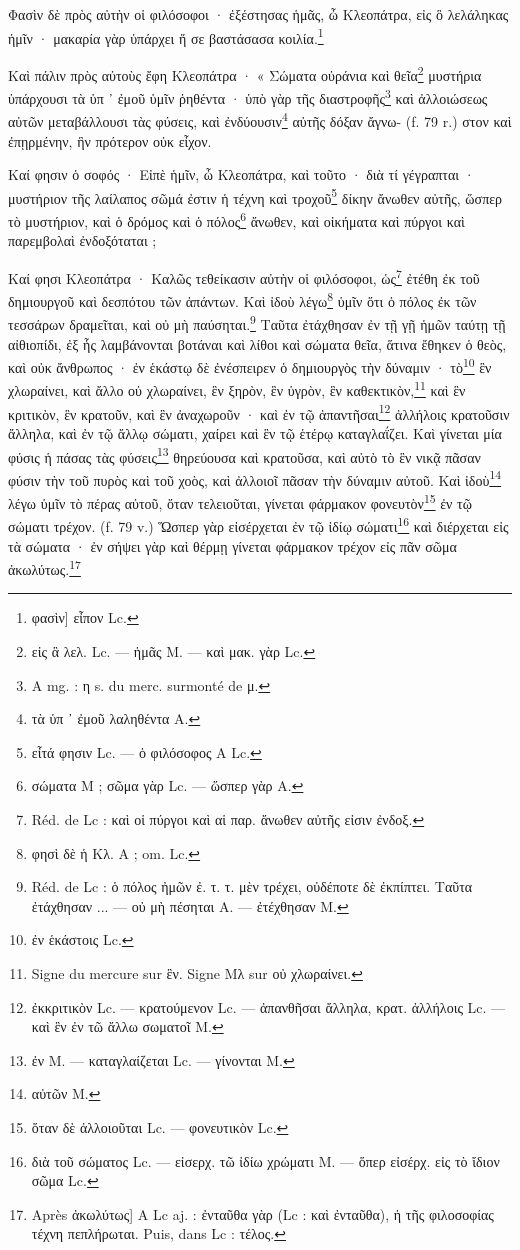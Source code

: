 \documentclass[a4paper, 11pt, oneside, polutonikogreek, french]{article}
\begin{document}
Φασὶν δὲ πρὸς αὐτὴν οἱ φιλόσοφοι · ἐξέστησας ἡμᾶς, ὦ Κλεοπάτρα, εἰς ὃ λελάληκας ἡμῖν · μακαρία γὰρ ὑπάρχει ἥ σε βαστάσασα κοιλία.\footnote{φασὶν] εἶπον Lc.}

Καὶ πάλιν πρὸς αὐτοὺς ἔφη Κλεοπάτρα · « Σώματα οὐράνια καὶ θεῖα\footnote{εἰς ἃ λελ. Lc. --- ἡμᾶς M. --- καὶ μακ. γὰρ Lc.} μυστήρια ὑπάρχουσι τὰ ὑπ ᾽ ἐμοῦ ὑμῖν ῥηθέντα · ὑπὸ γὰρ τῆς διαστροφῆς\footnote{A mg. : η s. du merc. surmonté de μ.} καὶ ἀλλοιώσεως αὐτῶν μεταβάλλουσι τὰς φύσεις, καὶ ἐνδύουσιν\footnote{τὰ ὑπ ᾽ ἐμοῦ λαληθέντα A.} αὐτῆς δόξαν ἄγνω- (f. 79 r.) στον καὶ ἐπῃρμένην, ἣν πρότερον οὐκ εἶχον.

Καί φησιν ὁ σοφός · Εἰπὲ ἡμῖν, ὦ Κλεοπάτρα, καὶ τοῦτο · διὰ τί γέγραπται · μυστήριον τῆς λαίλαπος σῶμά ἐστιν ἡ τέχνη καὶ τροχοῦ\footnote{εἶτά φησιν Lc. --- ὁ φιλόσοφος A Lc.} δίκην ἄνωθεν αὐτῆς, ὥσπερ τὸ μυστήριον, καὶ ὁ δρόμος καὶ ὁ πόλος\footnote{σώματα M ; σῶμα γὰρ Lc. --- ὥσπερ γὰρ A.} ἄνωθεν, καὶ οἰκήματα καὶ πύργοι καὶ παρεμβολαὶ ἐνδοξόταται ;

Καί φησι Κλεοπάτρα · Καλῶς τεθείκασιν αὐτὴν οἱ φιλόσοφοι, ὡς\footnote{Réd. de Lc : καὶ οἱ πύργοι καὶ αἱ παρ. ἄνωθεν αὐτῆς εἰσιν ἐνδοξ.} ἐτέθη ἐκ τοῦ δημιουργοῦ καὶ δεσπότου τῶν ἀπάντων. Καὶ ἰδοὺ λέγω\footnote{φησὶ δὲ ἡ Kλ. A ; om. Lc.} ὑμῖν ὅτι ὁ πόλος ἐκ τῶν τεσσάρων δραμεῖται, καὶ οὐ μὴ παύσηται.\footnote{Réd. de Lc : ὁ πόλος ἠμῶν ἐ. τ. τ. μὲν τρέχει, οὐδέποτε δὲ ἐκπίπτει. Ταῦτα ἐτάχθησαν ... --- οὐ μὴ πέσηται A. --- ἐτέχθησαν M.} Ταῦτα ἐτάχθησαν ἐν τῇ γῇ ἡμῶν ταύτῃ τῇ αἰθιοπίδι, ἐξ ἧς λαμβάνονται βοτάναι καὶ λίθοι καὶ σώματα θεῖα, ἅτινα ἔθηκεν ὁ θεὸς, καὶ οὐκ ἄνθρωπος · ἐν ἑκάστῳ δὲ ἐνέσπειρεν ὁ δημιουργὸς τὴν δύναμιν · τὸ\footnote{ἐν ἑκάστοις Lc.} ἓν χλωραίνει, καὶ ἄλλο οὐ χλωραίνει, ἓν ξηρὸν, ἓν ὑγρὸν, ἓν καθεκτικὸν,\footnote{Signe du mercure sur ἓν. Signe Mλ sur οὐ χλωραίνει.} καὶ ἓν κριτικὸν, ἓν κρατοῦν, καὶ ἓν ἀναχωροῦν · καὶ ἐν τῷ ἀπαντῆσαι\footnote{ἐκκριτικὸν Lc. --- κρατούμενον Lc. --- ἀπανθῆσαι ἄλληλα, κρατ. ἀλλήλοις Lc. --- καὶ ἓν ἐν τῶ ἄλλω σωματοῖ M.} ἀλλήλοις κρατοῦσιν ἄλληλα, καὶ ἐν τῷ ἄλλῳ σώματι, χαίρει καὶ ἓν τῷ ἑτέρῳ καταγλαΐζει. Καὶ γίνεται μία φύσις ἡ πάσας τὰς φύσεις\footnote{ἐν M. --- καταγλαίζεται Lc. --- γίνονται M.} θηρεύουσα καὶ κρατοῦσα, καὶ αὐτὸ τὸ ἓν νικᾷ πᾶσαν φύσιν τὴν τοῦ πυρὸς καὶ τοῦ χοὸς, καὶ ἀλλοιοῖ πᾶσαν τὴν δύναμιν αὐτοῦ. Καὶ ἰδοὺ\footnote{αὐτῶν M.} λέγω ὑμῖν τὸ πέρας αὐτοῦ, ὅταν τελειοῦται, γίνεται φάρμακον φονευτὸν\footnote{ὅταν δὲ ἀλλοιοῦται Lc. --- φονευτικὸν Lc.} ἐν τῷ σώματι τρέχον. (f. 79 v.) Ὥσπερ γὰρ εἰσέρχεται ἐν τῷ ἰδίῳ σώματι\footnote{διὰ τοῦ σώματος Lc. --- εἰσερχ. τῶ ἰδίω χρώματι M. --- ὅπερ εἰσέρχ. εἰς τὸ ἴδιον σῶμα Lc.} καὶ διέρχεται εἰς τὰ σώματα · ἐν σήψει γὰρ καὶ θέρμῃ γίνεται φάρμακον τρέχον εἰς πᾶν σῶμα ἀκωλύτως.\footnote{Après ἀκωλύτως] A Lc aj. : ἐνταῦθα γὰρ (Lc : καὶ ἐνταῦθα), ἡ τῆς φιλοσοφίας τέχνη πεπλήρωται. Puis, dans Lc : τέλος.}
\end{document}

